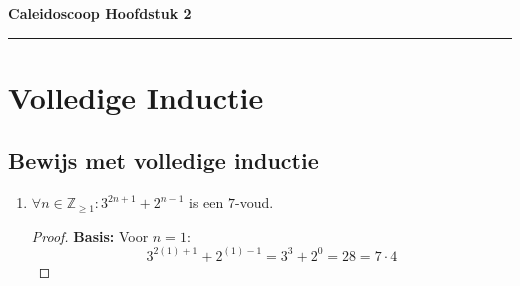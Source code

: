\documentclass{article}
\begin{document}
\begin{center}
    \Large \textbf{Caleidoscoop Hoofdstuk 2}
\end{center}

\rule{\textwidth}{2pt}

\bigskip

\section{Volledige Inductie}

\subsection{Bewijs met volledige inductie}
\begin{enumerate}[label=\alph*)]
    \item $\forall n \in \mathbb{Z}_{\geq 1} : 3^{2n + 1} + 2^{n-1}$ is een $7$-voud.
        \begin{proof}
            \textbf{Basis:} Voor $n=1$:
            \[
                3^{2(1)+1} + 2^{(1)-1} = 3^3+2^0 = 28 = 7\cdot4
            \]
            

\end{proof}
\end{enumerate}
\end{document}
